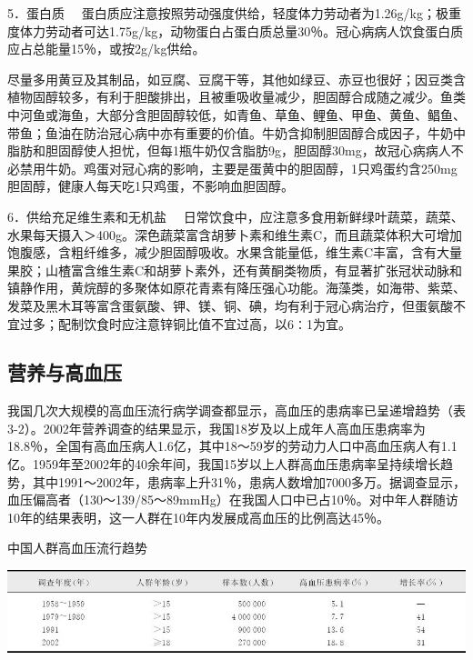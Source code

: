 {5．蛋白质}
　蛋白质应注意按照劳动强度供给，轻度体力劳动者为1.26g/kg；极重度体力劳动者可达1.75g/kg，动物蛋白占蛋白质总量30％。冠心病病人饮食蛋白质应占总能量15％，或按2g/kg供给。

尽量多用黄豆及其制品，如豆腐、豆腐干等，其他如绿豆、赤豆也很好；因豆类含植物固醇较多，有利于胆酸排出，且被重吸收量减少，胆固醇合成随之减少。鱼类中河鱼或海鱼，大部分含胆固醇较低，如青鱼、草鱼、鲤鱼、甲鱼、黄鱼、鲳鱼、带鱼；鱼油在防治冠心病中亦有重要的价值。牛奶含抑制胆固醇合成因子，牛奶中脂肪和胆固醇使人担忧，但每1瓶牛奶仅含脂肪9g，胆固醇30mg，故冠心病病人不必禁用牛奶。鸡蛋对冠心病的影响，主要是蛋黄中的胆固醇，1只鸡蛋约含250mg胆固醇，健康人每天吃1只鸡蛋，不影响血胆固醇。

{6．供给充足维生素和无机盐}
　日常饮食中，应注意多食用新鲜绿叶蔬菜，蔬菜、水果每天摄入＞400g。深色蔬菜富含胡萝卜素和维生素C，而且蔬菜体积大可增加饱腹感，含粗纤维多，减少胆固醇吸收。水果含能量低，维生素C丰富，含有大量果胶；山楂富含维生素C和胡萝卜素外，还有黄酮类物质，有显著扩张冠状动脉和镇静作用，黄烷醇的多聚体如原花青素有降压强心功能。海藻类，如海带、紫菜、发菜及黑木耳等富含蛋氨酸、钾、镁、铜、碘，均有利于冠心病治疗，但蛋氨酸不宜过多；配制饮食时应注意锌铜比值不宜过高，以6∶1为宜。

\hypertarget{text00004.htmlux5cux23mllj8}{%
\subsection{营养与高血压}\label{text00004.htmlux5cux23mllj8}}

我国几次大规模的高血压流行病学调查都显示，高血压的患病率已呈递增趋势（表3-2）。2002年营养调查的结果显示，我国18岁及以上成年人高血压患病率为18.8％，全国有高血压病人1.6亿，其中18～59岁的劳动力人口中高血压病人有1.1亿。1959年至2002年的40余年间，我国15岁以上人群高血压患病率呈持续增长趋势，其中1991～2002年，患病率上升31％，患病人数增加7000多万。据调查显示，血压偏高者（130～139/85～89mmHg）在我国人口中已占10％。对中年人群随访10年的结果表明，这一人群在10年内发展成高血压的比例高达45％。

\begin{table}[htbp]
\centering
\caption{中国人群高血压流行趋势}
\label{tab3-2}
\includegraphics{./images/Image00017.jpg}
\end{table}

